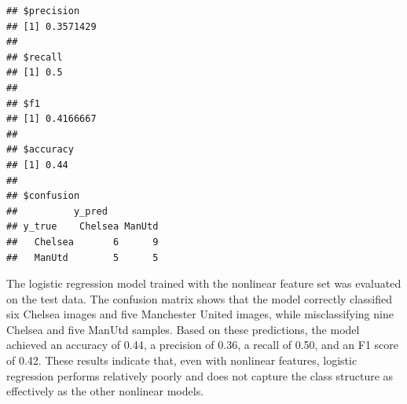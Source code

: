 \documentclass[
]{article}
\begin{document}
\begin{verbatim}
## $precision
## [1] 0.3571429
## 
## $recall
## [1] 0.5
## 
## $f1
## [1] 0.4166667
## 
## $accuracy
## [1] 0.44
## 
## $confusion
##          y_pred
## y_true    Chelsea ManUtd
##   Chelsea       6      9
##   ManUtd        5      5
\end{verbatim}

The logistic regression model trained with the nonlinear feature set was
evaluated on the test data. The confusion matrix shows that the model
correctly classified six Chelsea images and five Manchester United
images, while misclassifying nine Chelsea and five ManUtd samples. Based
on these predictions, the model achieved an accuracy of 0.44, a
precision of 0.36, a recall of 0.50, and an F1 score of 0.42. These
results indicate that, even with nonlinear features, logistic regression
performs relatively poorly and does not capture the class structure as
effectively as the other nonlinear models.
\end{document}

